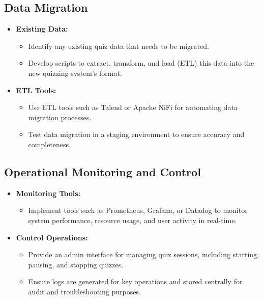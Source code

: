 \subsection{Data Migration}

\begin{itemize}
    \item \textbf{Existing Data:}
          \begin{itemize}
              \item Identify any existing quiz data that needs to be migrated.
              \item Develop scripts to extract, transform, and load (ETL) this data into the new quizzing system’s format.
          \end{itemize}
    \item \textbf{ETL Tools:}
          \begin{itemize}
              \item Use ETL tools such as Talend or Apache NiFi for automating data migration processes.
              \item Test data migration in a staging environment to ensure accuracy and completeness.
          \end{itemize}
\end{itemize}


\subsection{Operational Monitoring and Control}

\begin{itemize}
    \item \textbf{Monitoring Tools:}
          \begin{itemize}
              \item Implement tools such as Prometheus, Grafana, or Datadog to monitor system performance, resource usage, and user activity in real-time.
          \end{itemize}
    \item \textbf{Control Operations:}
          \begin{itemize}
              \item Provide an admin interface for managing quiz sessions, including starting, pausing, and stopping quizzes.
              \item Ensure logs are generated for key operations and stored centrally for audit and troubleshooting purposes.
          \end{itemize}
\end{itemize}


